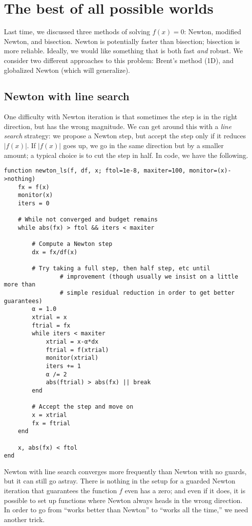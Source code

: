 \documentclass[12pt, leqno]{article} %
\begin{document}

\section{The best of all possible worlds}

Last time, we discussed three methods of solving $f(x) = 0$:
Newton, modified Newton, and bisection.  Newton is potentially faster
than bisection; bisection is more reliable.  Ideally, we would like
something that is both fast {\em and} robust.  We consider two
different approaches to this problem: Brent's method (1D), and
globalized Newton (which will generalize).

\subsection{Newton with line search}

One difficulty with Newton iteration is that sometimes the step is
in the right direction, but has the wrong magnitude.  We can get
around this with a {\em line search} strategy: we propose a Newton
step, but accept the step only if it reduces $|f(x)|$.  If $|f(x)|$
goes up, we go in the same direction but by a smaller amount;
a typical choice is to cut the step in half.  In code, we have the following.

\begin{lstlisting}
function newton_ls(f, df, x; ftol=1e-8, maxiter=100, monitor=(x)->nothing)
	fx = f(x)
	monitor(x)
	iters = 0

	# While not converged and budget remains
	while abs(fx) > ftol && iters < maxiter

		# Compute a Newton step
		dx = fx/df(x)

		# Try taking a full step, then half step, etc until
                # improvement (though usually we insist on a little more than
                # simple residual reduction in order to get better guarantees)
		α = 1.0
		xtrial = x
		ftrial = fx
		while iters < maxiter
			xtrial = x-α*dx
			ftrial = f(xtrial)
			monitor(xtrial)
			iters += 1
			α /= 2
			abs(ftrial) > abs(fx) || break
		end

		# Accept the step and move on
		x = xtrial
		fx = ftrial
	end

	x, abs(fx) < ftol
end
\end{lstlisting}

Newton with line search converges more frequently than Newton with no
guards, but it can still go astray.  There is nothing in the setup for
a guarded Newton iteration that guarantees the function $f$ even has a
zero; and even if it does, it is possible to set up functions where
Newton always heads in the wrong direction.  In order to go from
``works better than Newton'' to ``works all the time,'' we need
another trick.
\end{document}
